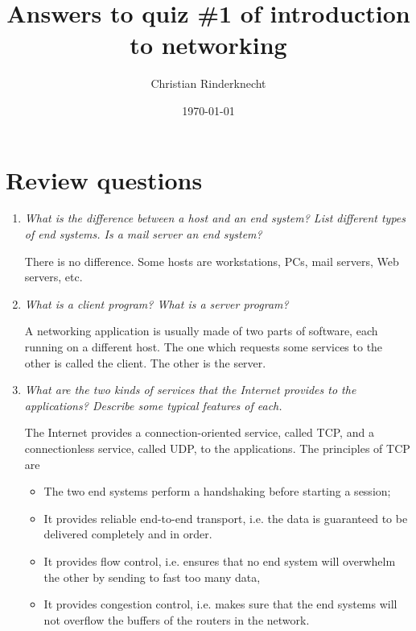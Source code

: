 \documentclass[11pt,a4paper]{article}
\title{Answers to quiz \#1 of introduction to networking}
\author{Christian Rinderknecht}
\date{\today}
\begin{document}
\maketitle

\section{Review questions}

\begin{enumerate}

  \item \emph{What is the difference between a host and an end system?
  List different types of end systems. Is a mail server an end
  system?}

  There is no difference. Some hosts are workstations, PCs, mail
  servers, Web servers, etc.

  \item \emph{What is a client program? What is a server program?}

  A networking application is usually made of two parts of software,
  each running on a different host. The one which requests some
  services to the other is called the client. The other is the
  server.

  \item \emph{What are the two kinds of services that the Internet
  provides to the applications? Describe some typical features of
  each.}

  The Internet provides a connection-oriented service, called TCP, and
  a connectionless service, called UDP, to the applications. The
  principles of TCP are
  \begin{itemize}
    \item The two end systems perform a handshaking before starting a
    session;

    \item It provides reliable end-to-end transport, i.e. the data is
    guaranteed to be delivered completely and in order.

    \item It provides flow control, i.e. ensures that no end system
    will overwhelm the other by sending to fast too many data,

    \item It provides congestion control, i.e. makes sure that the end
    systems will not overflow the buffers of the routers in the
    network.
  \end{itemize}


\end{enumerate}
\end{document}
